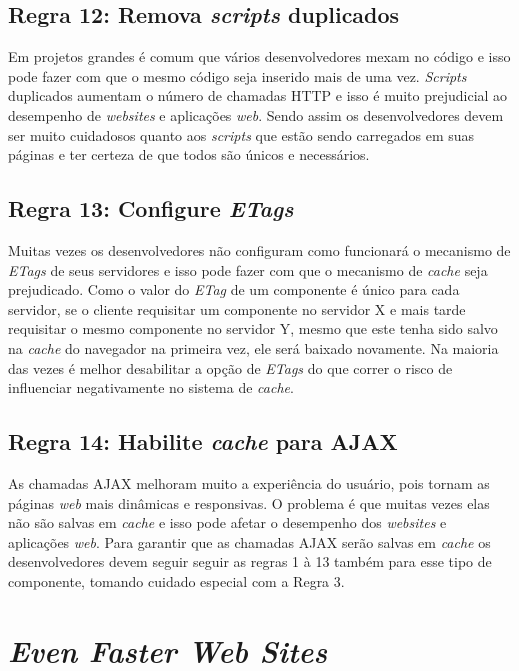 \subsection{Regra 12: Remova \textit{scripts} duplicados}
\label{subsec:highperformance_regra12}
Em projetos grandes é comum que vários desenvolvedores mexam no código e isso pode fazer com que o mesmo código seja inserido mais de uma vez. \textit{Scripts} duplicados aumentam o número de chamadas HTTP e isso é muito prejudicial ao desempenho de \textit{websites} e aplicações \textit{web}. Sendo assim os desenvolvedores devem ser muito cuidadosos quanto aos \textit{scripts} que estão sendo carregados em suas páginas e ter certeza de que todos são únicos e necessários.

\subsection{Regra 13: Configure \textit{ETags}}
\label{subsec:highperformance_regra13}
Muitas vezes os desenvolvedores não configuram como funcionará o mecanismo de \textit{ETags} de seus servidores e isso pode fazer com que o mecanismo de \textit{cache} seja prejudicado. Como o valor do \textit{ETag} de um componente é único para cada servidor, se o cliente requisitar um componente no servidor X e mais tarde requisitar o mesmo componente no servidor Y, mesmo que este tenha sido salvo na \textit{cache} do navegador na primeira vez, ele será baixado novamente. Na maioria das vezes é melhor desabilitar a opção de \textit{ETags} do que correr o risco de influenciar negativamente no sistema de \textit{cache}.

\subsection{Regra 14: Habilite \textit{cache} para AJAX}
\label{subsec:highperformance_regra14}
As chamadas AJAX melhoram muito a experiência do usuário, pois tornam as páginas \textit{web} mais dinâmicas e responsivas. O problema é que muitas vezes elas não são salvas em \textit{cache} e isso pode afetar o desempenho dos \textit{websites} e aplicações \textit{web}. Para garantir que as chamadas AJAX serão salvas em \textit{cache} os desenvolvedores devem seguir seguir as regras 1 à 13 também para esse tipo de componente, tomando cuidado especial com a Regra 3.

\section{\textit{Even Faster Web Sites}}
\label{sec:evenfasterwebsites}

